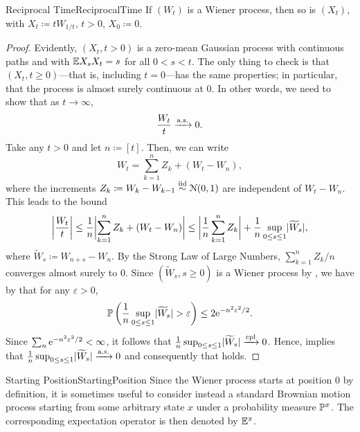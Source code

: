 \begin{thm}{Reciprocal Time}{ReciprocalTime}
	If $(W_t)$ is a Wiener process, then so is $(X_t)$, with $X_t \coloneqq t W_{1/t}, \, t > 0, \, X_0 \coloneqq 0$.
\end{thm}

\begin{proof}
	Evidently, $(X_t, t > 0)$ is a zero-mean Gaussian process with continuous paths and with $\E X_s X_t = s$ for all $0 < s < t$. The only thing to check is that $(X_t, t \ge 0)$—that is, including $t = 0$—has the same properties; in particular, that the process is almost surely continuous at 0. In other words, we need to show that as $t \to \infty$,
	\begin{equation}\label{eq:AlmostSureLimitAtInfinity}
		\frac{W_t}{t} \cas 0.
	\end{equation}
	Take any $t > 0$ and let $n \coloneqq [t]$. Then, we can write
	\[
		W_t = \sum_{k=1}^n Z_k + (W_t - W_n),
	\]
	where the increments $Z_k \coloneqq W_k - W_{k-1} \simiid \Nor(0, 1)$ are independent of $W_t - W_n$. This leads to the bound
	\[
		\abs[\bigg]{\frac{W_t}{t}}
		\le \frac{1}{n} \abs[\bigg]{\sum_{k=1}^n Z_k + (W_t - W_n)}
		\le \abs[\bigg]{\frac{1}{n} \sum_{k=1}^n Z_k} + \frac{1}{n} \sup_{0 \le s \le 1} \abs{\widetilde{W}_s},
	\]
	where $\widetilde{W}_s \coloneqq W_{n+s} - W_n$. By the Strong Law of Large Numbers,  $\sum_{k=1}^n Z_k/n$ converges almost surely to 0. Since $(\widetilde{W}_s, s \ge 0)$ is a Wiener process by , we have by  that for any $\varepsilon > 0$,
	\[
		\Prob\left( \frac{1}{n} \sup_{0 \le s \le 1} \abs{\widetilde{W}_s} > \varepsilon \right)
		\le 2 \e^{-n^2 \varepsilon^2/2}.
	\]
	Since $\sum_n \e^{-n^2 \varepsilon^2/2} < \infty$, it follows that $\frac{1}{n} \sup_{0 \le s \le 1} \abs{\widetilde{W}_s} \xrightarrow{\mathrm{cpl}} 0$. Hence,  implies that $\frac{1}{n} \sup_{0 \le s \le 1} \abs{\widetilde{W}_s} \cas 0$ and consequently that  holds.
\end{proof}

\begin{xtip}{Starting Position}{StartingPosition}
	Since the Wiener process starts at position 0 by definition, it is sometimes useful to consider instead a standard Brownian motion process starting from some arbitrary state $x$ under a probability measure $\Prob^x$. The corresponding expectation operator is then denoted by $\E^x$.
\end{xtip}

